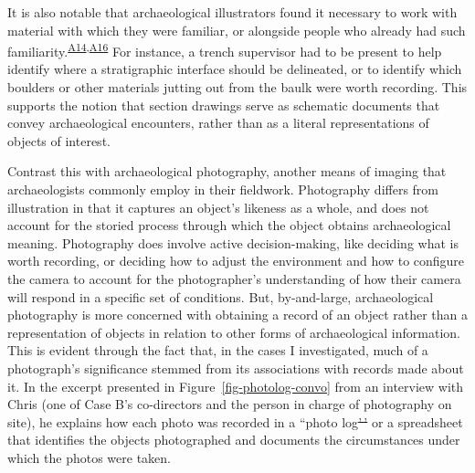 \documentclass[
]{article}
\makeatletter
\providecommand{\DIFadd}[1]{{\protect\color{blue}\uwave{#1}}} %
\providecommand{\DIFdel}[1]{{\protect\color{red}\sout{#1}}} %
\providecommand{\DIFaddbegin}{} %
\providecommand{\DIFaddend}{} %
\providecommand{\DIFdelbegin}{} %
\providecommand{\DIFdelend}{} %
\newcommand{\DIFscaledelfig}{0.5}
\newlength{\DIFdelgraphicswidth} %
\newlength{\DIFdelgraphicsheight} %
\newcommand{\DIFaddincludegraphics}[2][]{{\color{blue}\fbox{\DIFOincludegraphics[#1]{#2}}}} %
\newcommand{\DIFdelincludegraphics}[2][]{%
\sbox{\DIFdelgraphicsbox}{\DIFOincludegraphics[#1]{#2}}%
\settoboxwidth{\DIFdelgraphicswidth}{\DIFdelgraphicsbox} %
\settoboxtotalheight{\DIFdelgraphicsheight}{\DIFdelgraphicsbox} %
\scalebox{\DIFscaledelfig}{%
\parbox[b]{\DIFdelgraphicswidth}{\usebox{\DIFdelgraphicsbox}\\[-\baselineskip] \rule{\DIFdelgraphicswidth}{0em}}\llap{\resizebox{\DIFdelgraphicswidth}{\DIFdelgraphicsheight}{%
\setlength{\unitlength}{\DIFdelgraphicswidth}%
\begin{picture}(1,1)%
\thicklines\linethickness{2pt} %
{\color[rgb]{1,0,0}\put(0,0){\framebox(1,1){}}}%
{\color[rgb]{1,0,0}\put(0,0){\line( 1,1){1}}}%
{\color[rgb]{1,0,0}\put(0,1){\line(1,-1){1}}}%
\end{picture}%
}\hspace*{3pt}}} %
} %
\DeclareRobustCommand{\DIFaddbegin}{\DIFOaddbegin \let\includegraphics\DIFaddincludegraphics} %
\DeclareRobustCommand{\DIFaddend}{\DIFOaddend \let\includegraphics\DIFOincludegraphics} %
\DeclareRobustCommand{\DIFdelbegin}{\DIFOdelbegin \let\includegraphics\DIFdelincludegraphics} %
\DeclareRobustCommand{\DIFdelend}{\DIFOaddend \let\includegraphics\DIFOincludegraphics} %
\let\sout@orig\sout %
\renewcommand{\sout}[1]{\ifmmode\text{\sout@orig{\ensuremath{#1}}}\else\sout@orig{#1}\fi} %
\makeatother
\begin{document}
It is also notable that archaeological illustrators found it necessary
to work with material with which they were familiar, or alongside people
who already had such
familiarity.\textsuperscript{\hyperref[sec-A14]{A14},\hyperref[sec-A16]{A16}}
For instance, a trench supervisor had to be present to help identify
where a stratigraphic interface should be delineated, or to identify
which boulders or other materials jutting out from the baulk were worth
recording. This supports the notion that section drawings serve as
schematic documents that convey archaeological encounters, rather than
as a literal representations of objects of interest.

Contrast this with archaeological photography, another means of imaging
that archaeologists commonly employ in their fieldwork. Photography
differs from illustration in that it captures an object's likeness as a
whole, and does not account for the storied process through which the
object obtains archaeological meaning. Photography does involve active
decision-making, like deciding what is worth recording, or deciding how
to adjust the environment and how to configure the camera to account for
the photographer's understanding of how their camera will respond in a
specific set of conditions. But, by-and-large, archaeological
photography is more concerned with obtaining a record of an object
rather than a representation of objects in relation to other forms of
archaeological information. This is evident through the fact that, in
the cases I investigated, much of a photograph's significance stemmed
from its associations with records made about it. In the excerpt
presented in Figure~\ref{fig-photolog-convo} from an interview with
Chris (one of Case B's co-directors and the person in charge of
photography on site), he explains how each photo was recorded in a
``photo log\DIFdelbegin \DIFdel{'\,' }\DIFdelend \DIFaddbegin \DIFadd{'' }\DIFaddend or a spreadsheet that identifies the objects photographed
and documents the circumstances under which the photos were taken.
\end{document}
